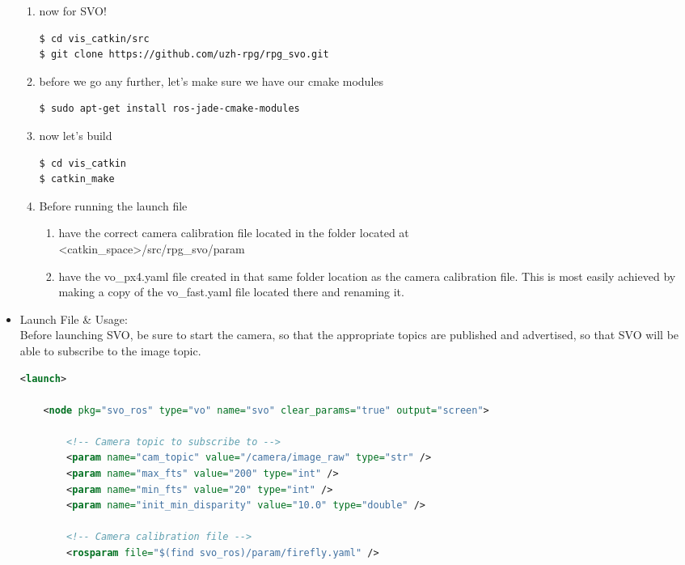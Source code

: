 \begin{itemize}
\begin{enumerate}
\item now for SVO!
\begin{lstlisting}[language=bash]
$ cd vis_catkin/src
$ git clone https://github.com/uzh-rpg/rpg_svo.git
\end{lstlisting}
\item before we go any further, let's make sure we have our cmake modules
\begin{lstlisting}[language=bash]
$ sudo apt-get install ros-jade-cmake-modules
\end{lstlisting}
\item now let's build
\begin{lstlisting}[language=bash]
$ cd vis_catkin
$ catkin_make
\end{lstlisting}
\item Before running the launch file
\begin{enumerate}
\item have the correct camera calibration file located in the folder located at\\ <catkin\_space>/src/rpg\_svo/param
\item have the vo\_px4.yaml file created in that same folder location as the camera calibration file. This is most easily achieved by making a copy of the vo\_fast.yaml file located there and renaming it.
\end{enumerate}
\end{enumerate}

\item Launch File \& Usage:\\

Before launching SVO, be sure to start the camera, so that the appropriate topics are published and advertised, so that SVO will be able to subscribe to the image topic.\\ 
\begin{lstlisting}[language=xml]
<launch>
  
    <node pkg="svo_ros" type="vo" name="svo" clear_params="true" output="screen">
    
        <!-- Camera topic to subscribe to -->
        <param name="cam_topic" value="/camera/image_raw" type="str" />
        <param name="max_fts" value="200" type="int" />
        <param name="min_fts" value="20" type="int" />
        <param name="init_min_disparity" value="10.0" type="double" />
        
        <!-- Camera calibration file -->
        <rosparam file="$(find svo_ros)/param/firefly.yaml" />
        

\end{lstlisting}
\end{itemize}
